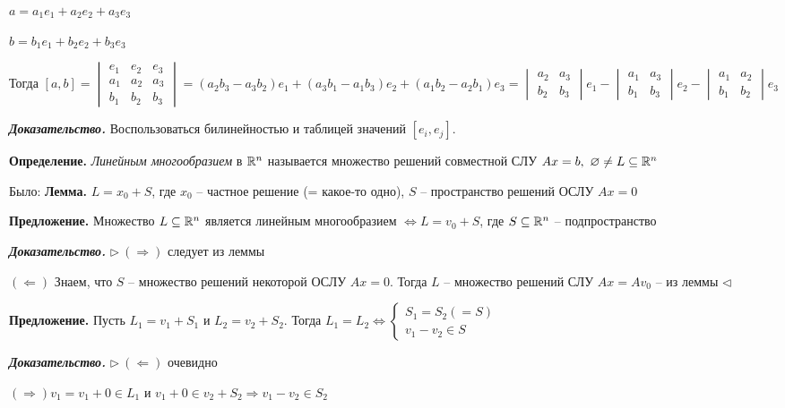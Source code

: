 $a = a_1 e_1 + a_2 e_2 + a_3 e_3$

$b = b_1 e_1 + b_2 e_2 + b_3 e_3$

Тогда $[a, b] = \begin{vmatrix} e_1 & e_2 & e_3 \\ a_1 & a_2 & a_3 \\ b_1 & b_2 & b_3 \end{vmatrix} = (a_2 b_3 - a_3 b_2) e_1 + (a_3 b_1 - a_1 b_3) e_2 + (a_1 b_2 - a_2 b_1) e_3 = \begin{vmatrix} a_2 & a_3 \\ b_2 & b_3 \end{vmatrix} e_1 - \begin{vmatrix} a_1 & a_3 \\ b_1 & b_3 \end{vmatrix} e_2 - \begin{vmatrix} a_1 & a_2 \\ b_1 & b_2 \end{vmatrix} e_3 $

\bigskip
\textbf{\textit{Доказательство.}} Воспользоваться билинейностью и таблицей значений $[e_i, e_j]$.

\bigskip
\textbf{Определение.} \textit{Линейным многообразием} в $\mathbb{R}^n$ называется множество решений совместной СЛУ $Ax = b, \ \varnothing \neq L \subseteq \mathbb{R}^n$

\bigskip
Было:
\textbf{Лемма.} $L = x_0 + S$, где $x_0$ -- частное решение (= какое-то одно), $S$ -- пространство решений ОСЛУ $Ax = 0$

\bigskip
\textbf{Предложение.} Множество $L \subseteq \mathbb{R}^n$ является линейным многообразием $\Leftrightarrow L = v_0 + S$, где $S \subseteq \mathbb{R}^n$ -- подпространство

\bigskip
\textbf{\textit{Доказательство.}} $\rhd \ (\Rightarrow)$ следует из леммы

$(\Leftarrow)$ Знаем, что $S$ -- множество решений некоторой ОСЛУ $Ax = 0$. Тогда $L$ -- множество решений СЛУ $Ax = A v_0$ -- из леммы $\lhd$

\bigskip
\textbf{Предложение.} Пусть $L_1 = v_1 + S_1$ и $L_2 = v_2 + S_2$. Тогда $L_1 = L_2 \Leftrightarrow \begin{cases} S_1 = S_2 (= S) \\ v_1 - v_2 \in S \end{cases}$

\bigskip
\textbf{\textit{Доказательство.}} $\rhd \ (\Leftarrow)$ очевидно

$(\Rightarrow) v_1 = v_1 + 0 \in L_1$ и $v_1 + 0 \in v_2 + S_2 \Rightarrow v_1 - v_2 \in S_2$

